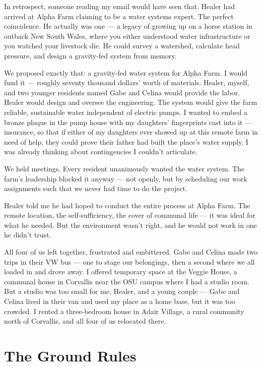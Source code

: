 In retrospect, someone reading my email would have seen that. Healer had arrived at Alpha Farm claiming to be a water systems expert. The perfect coincidence. He actually was one --- a legacy of growing up on a horse station in outback New South Wales, where you either understood water infrastructure or you watched your livestock die. He could survey a watershed, calculate head pressure, and design a gravity-fed system from memory.

We proposed exactly that: a gravity-fed water system for Alpha Farm. I would fund it --- roughly seventy thousand dollars' worth of materials. Healer, myself, and two younger residents named Gabe and Celina would provide the labor. Healer would design and oversee the engineering. The system would give the farm reliable, sustainable water independent of electric pumps. I wanted to embed a bronze plaque in the pump house with my daughters' fingerprints cast into it --- insurance, so that if either of my daughters ever showed up at this remote farm in need of help, they could prove their father had built the place's water supply. I was already thinking about contingencies I couldn't articulate.

We held meetings. Every resident unanimously wanted the water system. The farm's leadership blocked it anyway --- not openly, but by scheduling our work assignments such that we never had time to do the project.

Healer told me he had hoped to conduct the entire process at Alpha Farm. The remote location, the self-sufficiency, the cover of communal life --- it was ideal for what he needed. But the environment wasn't right, and he would not work in one he didn't trust.

All four of us left together, frustrated and embittered. Gabe and Celina made two trips in their VW bus --- one to stage our belongings, then a second where we all loaded in and drove away. I offered temporary space at the Veggie House, a communal house in Corvallis near the OSU campus where I had a studio room. But a studio was too small for me, Healer, and a young couple --- Gabe and Celina lived in their van and used my place as a home base, but it was too crowded. I rented a three-bedroom house in Adair Village, a rural community north of Corvallis, and all four of us relocated there.

\section*{The Ground Rules}
\label{record:af-the-ground-rules}

